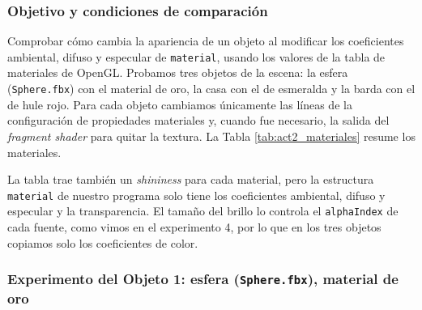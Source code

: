\subsubsection{Objetivo y condiciones de comparación}
Comprobar cómo cambia la apariencia de un objeto al modificar los coeficientes ambiental, difuso y especular de \texttt{material}, usando los valores de la tabla de materiales de OpenGL. Probamos tres objetos de la escena: la esfera (\texttt{Sphere.fbx}) con el material de oro, la casa con el de esmeralda y la barda con el de hule rojo. Para cada objeto cambiamos únicamente las líneas de la configuración de propiedades materiales y, cuando fue necesario, la salida del \textit{fragment shader} para quitar la textura. La Tabla \ref{tab:act2_materiales} resume los materiales.

\begin{table}[H]
    \centering
    \caption{Materiales aplicados a los tres objetos, tomados de la tabla de materiales de OpenGL.}
    \label{tab:act2_materiales}
\end{table}

La tabla trae también un \textit{shininess} para cada material, pero la estructura \texttt{material} de nuestro programa solo tiene los coeficientes ambiental, difuso y especular y la transparencia. El tamaño del brillo lo controla el \texttt{alphaIndex} de cada fuente, como vimos en el experimento 4, por lo que en los tres objetos copiamos solo los coeficientes de color.

\subsubsection{Experimento del Objeto 1: esfera (\texttt{Sphere.fbx}), material de oro}

